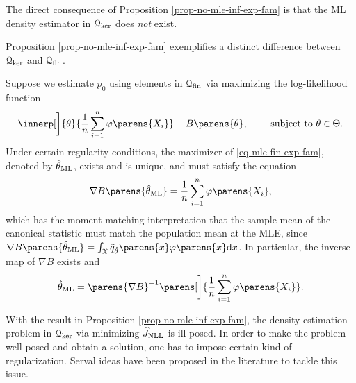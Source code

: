 The direct consequence of Proposition \ref{prop-no-mle-inf-exp-fam} is that the ML density estimator in $\mathcal{Q}_{\ker}$ does \emph{not} exist. 


\begin{remark}
	Proposition \ref{prop-no-mle-inf-exp-fam} exemplifies a distinct difference between $\mathcal{Q}_{\ker}$ and $\mathcal{Q}_{\mathrm{fin}}$. 
	
	Suppose we estimate $p_0$ using elements in $\mathcal{Q}_{\mathrm{fin}}$ via maximizing the log-likelihood function
	\begin{align}\label{eq-mle-fin-exp-fam}
		\innerp[\bigg]{\theta}{\frac{1}{n} \sum_{i=1}^n \varphi \parens{X_i}} - B \parens{\theta}, \qquad \text{ subject to } \theta \in \Theta. 
	\end{align}
	Under certain regularity conditions, the maximizer of \eqref{eq-mle-fin-exp-fam}, denoted by $\hat{\theta}_{\mathrm{ML}}$, exists and is unique, and must satisfy the equation 
	\begin{align*} %
		\nabla B \parens{\hat{\theta}_{\ML}} = \frac{1}{n} \sum_{i=1}^n \varphi \parens{X_i}, 
	\end{align*}
	which has the moment matching interpretation that the sample mean of the canonical statistic must match the population mean at the MLE, since $\nabla B \parens{\hat{\theta}_{\ML}} = \int_{\calX} \tilde{q}_{\hat{\theta}} \parens{x} \varphi \parens{x} \diff x$. In particular, the inverse map of $\nabla B$ exists and 
\begin{align*}
	\hat{\theta}_{\ML} = \parens{\nabla B}^{-1} \parens[\bigg]{\frac{1}{n} \sum_{i=1}^n \varphi \parens{X_i}}. 
\end{align*}
\end{remark}

With the result in Proposition \ref{prop-no-mle-inf-exp-fam}, the density estimation problem in $\mathcal{Q}_{\ker}$ via minimizing $\widehat{J}_{\mathrm{NLL}}$ is ill-posed. In order to make the problem well-posed and obtain a solution, one has to impose certain kind of regularization. Serval ideas have been proposed in the literature to tackle this issue. 

